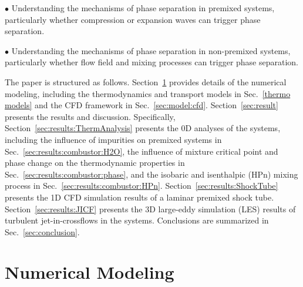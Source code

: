 \noindent$\bullet$ Understanding the mechanisms of phase separation in premixed  systems, particularly whether compression or expansion waves can trigger phase separation.

\noindent$\bullet$ Understanding the mechanisms of phase separation in non-premixed  systems, particularly whether flow field and mixing processes can trigger phase separation.


The paper is structured as follows. Section~\ref{sec:model} provides details of the numerical modeling, including the thermodynamics and transport models in Sec.~\ref{thermo models} and the CFD framework in Sec.~\ref{sec:model:cfd}. Section~\ref{sec:result} presents the results and discussion. Specifically, Section~\ref{sec:results:ThermAnalysis} presents the 0D analyses of the  systems, including the influence of impurities on premixed  systems in Sec.~\ref{sec:results:combustor:H2O}, the influence of mixture critical point and phase change on the thermodynamic properties in Sec.~\ref{sec:results:combustor:phase}, and the isobaric and isenthalpic (HPn) mixing process in Sec.~\ref{sec:results:combustor:HPn}. Section~\ref{sec:results:ShockTube} presents the 1D CFD simulation results of a laminar premixed  shock tube. Section~\ref{sec:results:JICF} presents the 3D large-eddy simulation (LES) results of turbulent jet-in-crossflows in the  systems.
Conclusions are summarized in Sec.~\ref{sec:conclusion}.

\section{Numerical Modeling}\label{sec:model}
